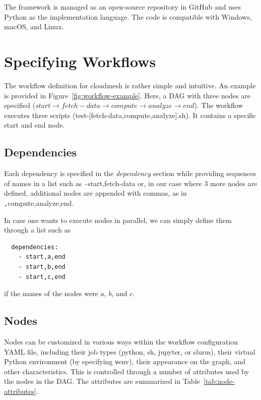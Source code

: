 \documentclass[sigplan,screen]{acmart}
\newcommand{\FILE}[1]{}
\begin{document}
The framework is managed as an open-source repository in GitHub and
uses Python as the implementation language. The code is compatible
with Windows, macOS, and Linux.

% 


\FILE{specifying-workflows.tex}

\section{Specifying Workflows}\label{specifying-workflows}

The workflow definition for cloudmesh is rather simple and intuitive.
An example is provided in Figure~\ref{fig:workflow-example}. Here, a
DAG with three nodes are specified ($start \rightarrow fetch-data
\rightarrow compute \rightarrow analyze \rightarrow end$). The
workflow executes three scripts
(test-[fetch-data,compute,analyze].sh). It contains a specific start
and end node.

\subsection{Dependencies}

Each dependency is specified in the {\em dependency} section while
providing sequences of names in a list such as
{\scriptsize\texttt -start,fetch-data}
or, in our case where 3 more nodes are defined,
additional nodes are appended with commas, as in
{\scriptsize\texttt ,compute,analyze,end}.

In case one wants to execute nodes in parallel, we can simply define
them through a list such as 


{\scriptsize
\begin{verbatim}
  dependencies:
    - start,a,end
    - start,b,end
    - start,c,end
\end{verbatim}
}

if the names of the nodes were $a$, $b$, and $c$. 

\subsection{Nodes}

Nodes can be customized in various ways within the workflow
configuration YAML file, including their job types (python, sh,
jupyter, or slurm), their virtual Python environment (by specifying
{\scriptsize\texttt venv}), their appearance on the graph, and other
characteristics. This is controlled through a number of attributes
used by the nodes in the DAG. The attributes are summarized in
Table~\ref{tab:node-attributes}.
\end{document}
